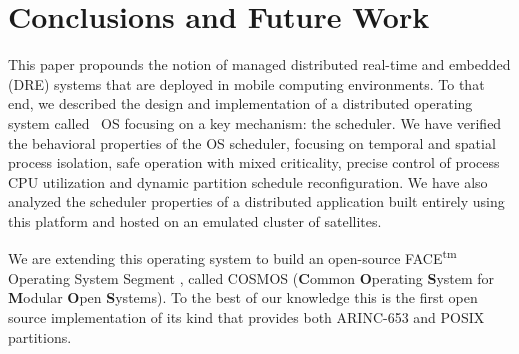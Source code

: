 \vspace{-0.1in}
\section{Conclusions and Future Work}
\label{sec:conclusions}

\iffalse
The \iap\ platform consists of a development environment and runtime
platform that provides an infrastructure to address several challenges
faced in deploying and managing a cluster of mobile embedded
platforms.  It provides the capability for domain specific modeling
and a novel real-time operating system with support for a distributed
component model and several management services for controlled and
managed deployment of applications on distributed computing nodes. 
\fi

This paper propounds the notion of managed distributed real-time and
embedded (DRE) systems that are deployed in mobile computing
environments. 
To that end, we described 
the design and implementation of a
distributed operating system called \iap\ OS focusing on a key
mechanism: the scheduler. 
We have verified the behavioral properties of the OS
scheduler, focusing on temporal and spatial process isolation, safe
operation with mixed criticality, precise control of process CPU
utilization and dynamic partition schedule reconfiguration.  We have
also analyzed the scheduler  properties of a
distributed application built entirely using this platform and hosted
on an emulated cluster of satellites.
\iffalse
 showcasing the usefulness of
model-driven design-time tools with support for model checking and code
generation significantly reducing the complexity for the developer.  
\fi

We  are extending this operating system  to build an open-source FACE\textsuperscript{tm} Operating System Segment \cite{face}, called COSMOS (\textbf{C}ommon \textbf{O}perating \textbf{S}ystem for \textbf{M}odular \textbf{O}pen \textbf{S}ystems). To the best of our knowledge this is the first open source implementation of its kind that provides both ARINC-653 and POSIX partitions.


